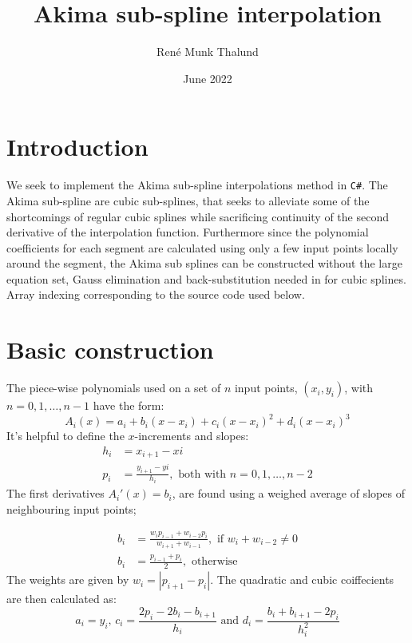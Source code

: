 \documentclass[a4paper]{article}
\title{Akima sub-spline interpolation}
\author{René Munk Thalund}
\date{June 2022}
\begin{document}
\maketitle

\section{Introduction}

We seek to implement the Akima sub-spline interpolations method in \texttt{C\#}. The Akima sub-spline are cubic sub-splines, that seeks to alleviate some of the shortcomings of regular cubic splines while sacrificing continuity of the second derivative of the interpolation function. Furthermore since the polynomial coefficients for each segment are calculated using only a few input points locally around the segment, the Akima sub splines can be constructed without the large equation set, Gauss elimination and back-substitution needed in for cubic splines. Array indexing corresponding to the source code used below.

\section{Basic construction}
The piece-wise polynomials used on a set of $n$ input points, $(x_i,y_i)$, with $n = 0,1, \ldots,n-1$ have the form:
\begin{equation}
    A_i(x) = a_i + b_i(x-x_i) + c_i(x-x_i)^2 + d_i(x-x_i)^3
\end{equation}
It's helpful to define the $x$-increments and slopes:
\begin{align}
    h_i &= x_{i+1} - x{i} \\
    p_i &= \frac{y_{i+1} - y{i}}{h_i}, \text{ both with } n = 0,1, \ldots,n-2
\end{align}
The first derivatives $A_i'(x) = b_i$, are found using a weighed average of slopes of neighbouring input points;

\begin{align}
    b_i &= \frac{w_{i}p_{i-1} + w_{i-2}p_{i}}{w_{i+1}+w_{i-1}}, \text{ if } w_{i}+w_{i-2} \neq 0  \nonumber \\
    b_i &= \frac{p_{i-1}+p_i}{2}, \text{ otherwise}
    \label{eq:b_formula}
\end{align}
The weights are given by $w_i = |p_{i+1}-p_i|$. The quadratic and cubic coiffecients are then calculated as:
\begin{equation}
    a_i = y_i,\,c_i = \frac{2p_i - 2b_i - b_{i+1}}{h_i} \text{  and  } d_i = \frac{b_i + b_{i+1}-2p_i}{h_i^2}
\end{equation}
\end{document}

